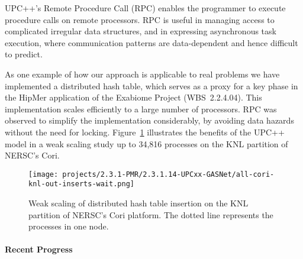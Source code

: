 UPC++'s Remote Procedure Call (RPC)
enables the programmer
to execute procedure calls on remote processors.
RPC is useful in managing access to complicated irregular data structures,
and in expressing asynchronous task execution, where communication patterns
are data-dependent and hence difficult to predict.


As one example of how our approach is applicable to real problems
we have implemented a distributed hash table, which serves as a proxy
for a key phase in the HipMer application of the Exabiome Project (WBS~2.2.4.04).
This implementation scales efficiently
to a large number of processors. RPC was observed to simplify the implementation
considerably, by avoiding data hazards without the need for locking.
Figure~\ref{fig:dht} illustrates the benefits of the UPC++ model 
in a weak scaling study up to 34,816 processes on the KNL partition of NERSC's Cori.


\begin{figure}[htb]
\centering
      \texttt{[image: projects/2.3.1-PMR/2.3.1.14-UPCxx-GASNet/all-cori-knl-out-inserts-wait.png]}
  \caption{Weak scaling of distributed hash table insertion on the KNL partition of NERSC's Cori platform. The dotted line represents the processes in one node.}
  \label{fig:dht}
\end{figure}



\paragraph{Recent Progress}

